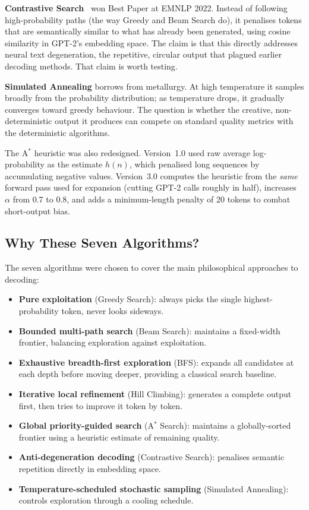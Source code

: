 \documentclass[12pt]{article}
\begin{document}
	\textbf{Contrastive Search}~\cite{su2022contrastive} won Best Paper at EMNLP 2022. Instead of following high-probability paths (the way Greedy and Beam Search do), it penalises tokens that are semantically similar to what has already been generated, using cosine similarity in GPT-2's embedding space. The claim is that this directly addresses neural text degeneration, the repetitive, circular output that plagued earlier decoding methods. That claim is worth testing.
	
	\textbf{Simulated Annealing} borrows from metallurgy. At high temperature it samples broadly from the probability distribution; as temperature drops, it gradually converges toward greedy behaviour. The question is whether the creative, non-deterministic output it produces can compete on standard quality metrics with the deterministic algorithms.
	
	The A$^*$ heuristic was also redesigned. Version~1.0 used raw average log-probability as the estimate $h(n)$, which penalised long sequences by accumulating negative values. Version~3.0 computes the heuristic from the \emph{same} forward pass used for expansion (cutting GPT-2 calls roughly in half), increases $\alpha$ from 0.7 to 0.8, and adds a minimum-length penalty of 20 tokens to combat short-output bias.
	
	\subsection{Why These Seven Algorithms?}
	
	The seven algorithms were chosen to cover the main philosophical approaches to decoding:
	
	\begin{itemize}[leftmargin=*]
		\item \textbf{Pure exploitation} (Greedy Search): always picks the single highest-probability token, never looks sideways.
		\item \textbf{Bounded multi-path search} (Beam Search): maintains a fixed-width frontier, balancing exploration against exploitation.
		\item \textbf{Exhaustive breadth-first exploration} (BFS): expands all candidates at each depth before moving deeper, providing a classical search baseline.
		\item \textbf{Iterative local refinement} (Hill Climbing): generates a complete output first, then tries to improve it token by token.
		\item \textbf{Global priority-guided search} (A$^*$ Search): maintains a globally-sorted frontier using a heuristic estimate of remaining quality.
		\item \textbf{Anti-degeneration decoding} (Contrastive Search): penalises semantic repetition directly in embedding space.
		\item \textbf{Temperature-scheduled stochastic sampling} (Simulated Annealing): controls exploration through a cooling schedule.
	\end{itemize}
	
\end{document}
